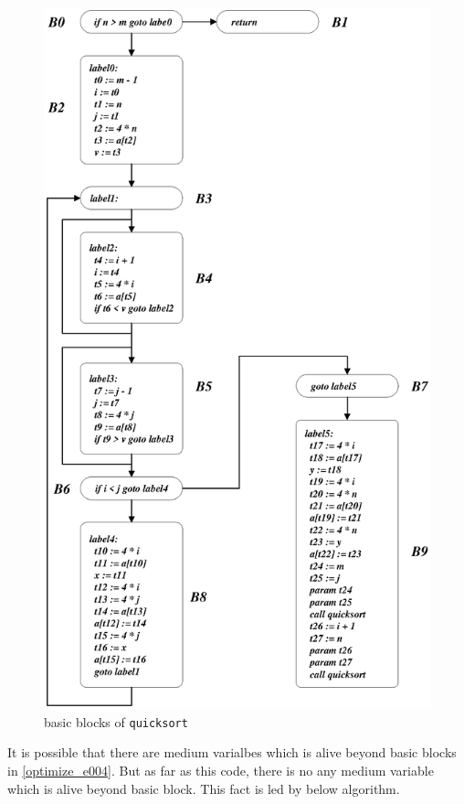 \begin{figure}[htbp]
\begin{center}
\begin{latexonly}
\includegraphics[width=1.01\linewidth,height=1.75\linewidth]{quicksort.eps}
\end{latexonly}
\caption{basic blocks of {\tt{quicksort}}}
\label{optimize_e002}
\end{center}
\end{figure}
It is possible that there are medium varialbes which is alive beyond
basic blocks in \ref{optimize_e004}. But as far as this code, there is
no any medium variable which is alive beyond basic block.
This fact is led by below algorithm.

